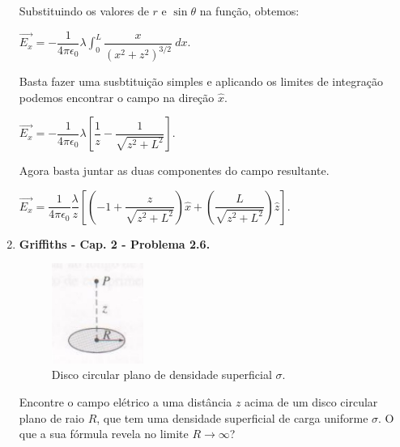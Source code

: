 \documentclass[11pt,a4paper]{article}
\begin{document}
\begin{enumerate}
Substituindo os valores de $r$ e $\sin \theta$ na função, obtemos:

\begin{center}

$\vec{E_x} = - \displaystyle\dfrac{1}{4 \pi \epsilon_0} \lambda \displaystyle\int_0^L \displaystyle\dfrac{x}{\left(x^2 + z^2\right)^{3/2}} \ dx$.

\end{center}

Basta fazer uma susbtituição simples e aplicando os limites de integração podemos encontrar o campo na direção $\hat{x}$.

\begin{center}

$\vec{E_x} = - \displaystyle\dfrac{1}{4 \pi \epsilon_0} \lambda \left[\displaystyle\dfrac{1}{z} - \displaystyle\dfrac{1}{\sqrt{z^2 + L^2}}\right]$.

\end{center}

Agora basta juntar as duas componentes do campo resultante. 

\begin{center}

$\vec{E_x} = \displaystyle\dfrac{1}{4 \pi \epsilon_0} \displaystyle\dfrac{\lambda}{z} \left[\left(-1 + \displaystyle\dfrac{z}{\sqrt{z^2 + L^2}}\right) \hat{x} + \left(\displaystyle\dfrac{L}{\sqrt{z^2 + L^2}}\right)\hat{z}\right]$.

\end{center}

\item \textbf{Griffiths - Cap. 2 - Problema 2.6.}

\begin{figure}[h]	
\centering %
\includegraphics[width=3cm]{Selection_072.jpg} 
\caption{Disco circular plano de densidade superficial $\sigma$.}
\end{figure}

Encontre o campo elétrico a uma distância $z$ acima de um disco circular plano de raio $R$, que tem uma densidade superficial de carga uniforme $\sigma$. O que a sua fórmula revela no limite $R \to \infty$? 


\end{enumerate}
\end{document}
